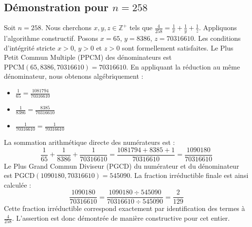 \documentclass[11pt,a4paper]{article}
\begin{document}
\subsection{Démonstration pour $n = 258$}
Soit $n = 258$. Nous cherchons $x, y, z \in \mathbb{Z}^{+}$ tels que $\frac{4}{258} = \frac{1}{x} + \frac{1}{y} + \frac{1}{z}$.
Appliquons l'algorithme constructif. Posons $x = 65$, $y = 8386$, $z = 70316610$.
Les conditions d'intégrité stricte $x > 0$, $y > 0$ et $z > 0$ sont formellement satisfaites.
Le Plus Petit Commun Multiple (PPCM) des dénominateurs est $\text{PPCM}(65, 8386, 70316610) = 70316610$.
En appliquant la réduction au même dénominateur, nous obtenons algébriquement :
\begin{itemize}
    \item $\frac{1}{65} = \frac{1081794}{70316610}$
    \item $\frac{1}{8386} = \frac{8385}{70316610}$
    \item $\frac{1}{70316610} = \frac{1}{70316610}$
\end{itemize}
La sommation arithmétique directe des numérateurs est :
$$ \frac{1}{65} + \frac{1}{8386} + \frac{1}{70316610} = \frac{1081794 + 8385 + 1}{70316610} = \frac{1090180}{70316610} $$
Le Plus Grand Commun Diviseur (PGCD) du numérateur et du dénominateur est $\text{PGCD}(1090180, 70316610) = 545090$.
La fraction irréductible finale est ainsi calculée :
$$ \frac{1090180}{70316610} = \frac{1090180 \div 545090}{70316610 \div 545090} = \frac{2}{129} $$
Cette fraction irréductible correspond exactement par identification des termes à $\frac{4}{258}$. L'assertion est donc démontrée de manière constructive pour cet entier.
\end{document}
